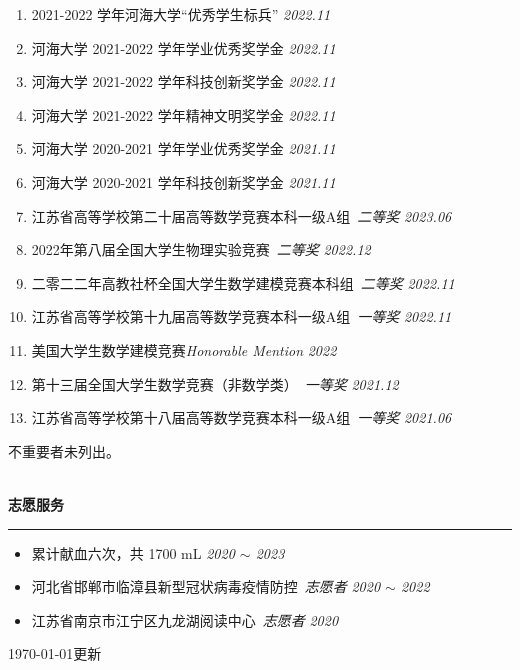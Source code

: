 \documentclass[12pt]{article}
\newcommand{\sect}[1]{
    ~\\ \noindent \textbf{#1} \medskip \hrule \medskip
}
\begin{document}
\begin{enumerate}
    \item 2021-2022 学年河海大学“优秀学生标兵” \hfill \textit{2022.11}
    \item 河海大学 2021-2022 学年学业优秀奖学金 \hfill \textit{2022.11}
    \item 河海大学 2021-2022 学年科技创新奖学金 \hfill \textit{2022.11}
    \item 河海大学 2021-2022 学年精神文明奖学金 \hfill \textit{2022.11}
    \item 河海大学 2020-2021 学年学业优秀奖学金 \hfill \textit{2021.11}
    \item 河海大学 2020-2021 学年科技创新奖学金 \hfill \textit{2021.11}
          \\
    \item 江苏省高等学校第二十届高等数学竞赛本科一级A组\ \textit{二等奖} \hfill \textit{2023.06}
    \item 2022年第八届全国大学生物理实验竞赛\ \textit{二等奖}  \hfill \textit{2022.12}
    \item 二零二二年高教社杯全国大学生数学建模竞赛本科组\ \textit{二等奖} \hfill \textit{2022.11}
    \item 江苏省高等学校第十九届高等数学竞赛本科一级A组\ \textit{一等奖} \hfill \textit{2022.11}
    \item 美国大学生数学建模竞赛\textit{Honorable Mention} \hfill \textit{2022}
    \item 第十三届全国大学生数学竞赛（非数学类）\ \textit{一等奖} \hfill \textit{2021.12}
    \item 江苏省高等学校第十八届高等数学竞赛本科一级A组\ \textit{一等奖} \hfill \textit{2021.06}
\end{enumerate}

\hfill {\tiny 不重要者未列出。}


\sect{志愿服务}

\begin{itemize}[noitemsep,nolistsep]
    \item 累计献血六次，共 1700 mL \hfill \textit{2020 $\sim$ 2023}
    \item 河北省邯郸市临漳县新型冠状病毒疫情防控\ \textit{志愿者} \hfill \textit{2020 $\sim$ 2022}
    \item 江苏省南京市江宁区九龙湖阅读中心\ \textit{志愿者} \hfill \textit{2020}
\end{itemize}

\hfill {\tiny \today 更新}
\end{document}
